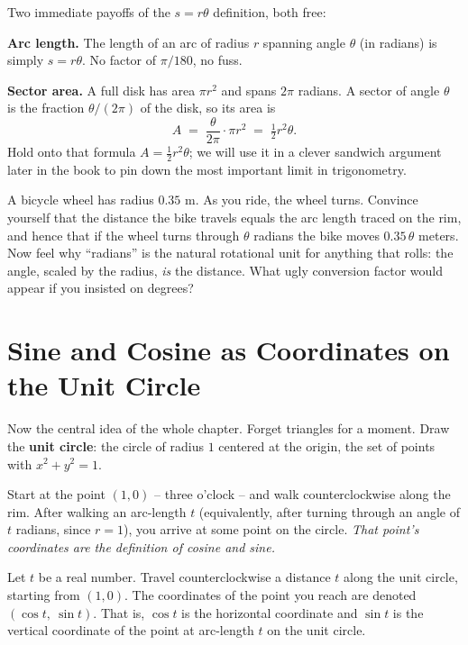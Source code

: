 Two immediate payoffs of the $s = r\theta$ definition, both free:

\textbf{Arc length.} The length of an arc of radius $r$ spanning angle $\theta$ (in radians) is simply $s = r\theta$. No factor of $\pi/180$, no fuss.

\textbf{Sector area.} A full disk has area $\pi r^2$ and spans $2\pi$ radians. A sector of angle $\theta$ is the fraction $\theta/(2\pi)$ of the disk, so its area is
\[
  A \;=\; \frac{\theta}{2\pi}\cdot \pi r^2 \;=\; \tfrac12 r^2 \theta.
\]
Hold onto that formula $A = \tfrac12 r^2\theta$; we will use it in a clever sandwich argument later in the book to pin down the most important limit in trigonometry.

\begin{walkbox}
A bicycle wheel has radius $0.35$ m. As you ride, the wheel turns. Convince yourself that the distance the bike travels equals the arc length traced on the rim, and hence that if the wheel turns through $\theta$ radians the bike moves $0.35\,\theta$ meters. Now feel why ``radians'' is the natural rotational unit for anything that rolls: the angle, scaled by the radius, \emph{is} the distance. What ugly conversion factor would appear if you insisted on degrees?
\end{walkbox}

\section{Sine and Cosine as Coordinates on the Unit Circle}
\label{ch04:unit-circle}

Now the central idea of the whole chapter. Forget triangles for a moment. Draw the \textbf{unit circle}: the circle of radius $1$ centered at the origin, the set of points with $x^2 + y^2 = 1$.

Start at the point $(1,0)$ -- three o'clock -- and walk counterclockwise along the rim. After walking an arc-length $t$ (equivalently, after turning through an angle of $t$ radians, since $r=1$), you arrive at some point on the circle. \emph{That point's coordinates are the definition of cosine and sine.}

\begin{definition}
\label{ch04:def-sincos}
Let $t$ be a real number. Travel counterclockwise a distance $t$ along the unit circle, starting from $(1,0)$. The coordinates of the point you reach are denoted $(\cos t,\ \sin t)$. That is, $\cos t$ is the horizontal coordinate and $\sin t$ is the vertical coordinate of the point at arc-length $t$ on the unit circle.
\end{definition}

